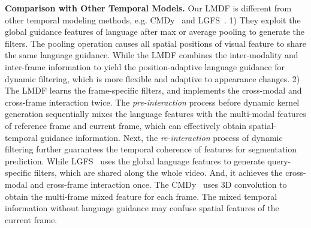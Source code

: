 \documentclass[10pt,twocolumn,letterpaper]{article}
\begin{document}
\noindent\textbf{Comparison with Other Temporal Models.} Our LMDF is different from other temporal modeling methods, e.g. CMDy~\cite{wang2020context} and LGFS~\cite{hui2021collaborative}.
1) They exploit the global guidance features of language after max or average pooling to generate the filters. The pooling operation causes all spatial positions of visual feature to share the same language guidance. While the LMDF combines the inter-modality and inter-frame information to yield the position-adaptive language guidance for dynamic filtering, which is more flexible and adaptive to appearance changes.
2) The LMDF learns the frame-specific filters, and implements the cross-modal and cross-frame interaction twice. The \emph{pre-interaction} process before dynamic kernel generation sequentially mixes the language features with the multi-modal features of reference frame and current frame, which can effectively obtain spatial-temporal guidance information. Next, the \emph{re-interaction} process of dynamic filtering further guarantees the temporal coherence of features for segmentation prediction. While LGFS~\cite{hui2021collaborative} uses the global language features to generate query-specific filters, which are shared along the whole video. And, it achieves the cross-modal and cross-frame interaction once. The CMDy~\cite{wang2020context} uses 3D convolution to obtain the multi-frame mixed feature for each frame. The mixed temporal information without language guidance may confuse spatial features of the current frame.
\end{document}
